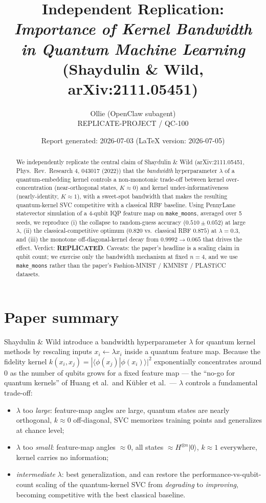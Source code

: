 \documentclass[11pt]{article}
\title{Independent Replication: \\ \emph{Importance of Kernel Bandwidth in Quantum Machine Learning} \\ (Shaydulin \& Wild, arXiv:2111.05451)}
\author{Ollie (OpenClaw subagent) \\ REPLICATE-PROJECT / QC-100}
\date{Report generated: 2026-07-03 \quad (LaTeX version: 2026-07-05)}
\begin{document}
\maketitle

\begin{abstract}
We independently replicate the central claim of Shaydulin \& Wild (arXiv:2111.05451,
Phys.\ Rev.\ Research 4, 043017 (2022)) that the \emph{bandwidth} hyperparameter
$\lambda$ of a quantum-embedding kernel controls a non-monotonic trade-off between
kernel over-concentration (near-orthogonal states, $K\!\approx\!0$) and kernel
under-informativeness (nearly-identity, $K\!\approx\!1$), with a sweet-spot
bandwidth that makes the resulting quantum-kernel SVC competitive with a classical
RBF baseline. Using PennyLane statevector simulation of a 4-qubit IQP feature map
on \texttt{make\_moons}, averaged over 5 seeds, we reproduce (i) the collapse to
random-guess accuracy ($0.510 \pm 0.052$) at large $\lambda$, (ii) the classical-competitive
optimum ($0.820$ vs.\ classical RBF $0.875$) at $\lambda=0.3$, and (iii) the monotone
off-diagonal-kernel decay from $0.9992 \to 0.065$ that drives the effect. Verdict:
\textbf{REPLICATED}. Caveats: the paper's headline is a scaling claim in qubit
count; we exercise only the bandwidth mechanism at fixed $n\!=\!4$, and we use
\texttt{make\_moons} rather than the paper's Fashion-MNIST / KMNIST / PLASTiCC
datasets.
\end{abstract}

\section{Paper summary}

Shaydulin \& Wild introduce a bandwidth hyperparameter $\lambda$ for quantum kernel
methods by rescaling inputs $x_i \leftarrow \lambda x_i$ inside a quantum feature
map. Because the fidelity kernel $k(x_i, x_j) = |\langle \phi(x_j) | \phi(x_i) \rangle|^2$
exponentially concentrates around $0$ as the number of qubits grows for a fixed
feature map --- the ``no-go for quantum kernels'' of Huang et al.\ and K\"ubler
et al.\ --- $\lambda$ controls a fundamental trade-off:
\begin{itemize}
  \item $\lambda$ too \emph{large}: feature-map angles are large, quantum states are
    nearly orthogonal, $k \approx 0$ off-diagonal, SVC memorizes training points and
    generalizes at chance level;
  \item $\lambda$ too \emph{small}: feature-map angles $\approx 0$, all states
    $\approx H^{\otimes n}|0\rangle$, $k \approx 1$ everywhere, kernel carries no
    information;
  \item \emph{intermediate} $\lambda$: best generalization, and can restore the
    performance-vs-qubit-count scaling of the quantum-kernel SVC from
    \emph{degrading} to \emph{improving}, becoming competitive with the best
    classical baseline.
\end{itemize}
\end{document}
